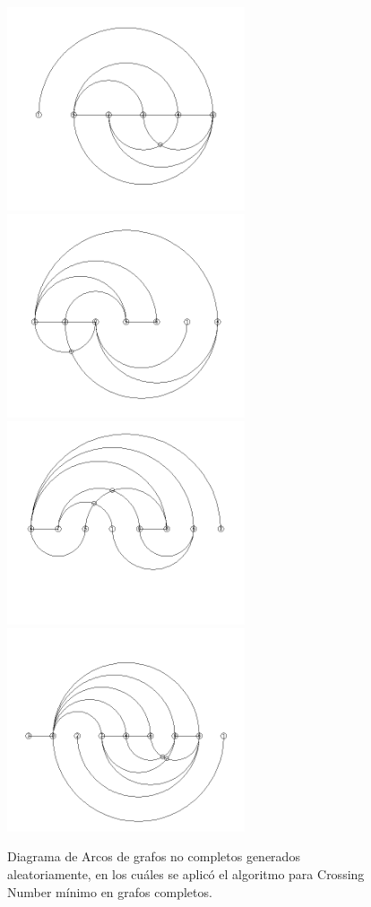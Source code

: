 	\begin{figure}
		\centering
		\includegraphics[width=7cm]{imagenes/grafo_aleatorio_6_nodos_bn.png}
		\includegraphics[width=7cm]{imagenes/grafo_aleatorio_7_nodos_bn.png}\\
		\includegraphics[width=7cm]{imagenes/grafo_aleatorio_8_nodos_bn.png}
		\includegraphics[width=7cm]{imagenes/grafo_aleatorio_9_nodos_bn.png}
		\caption{Diagrama de Arcos de grafos no completos generados aleatoriamente, en los cuáles se aplicó el algoritmo para Crossing Number mínimo en grafos completos.}
		\label{fig:arcdiagram_no_completo}
	\end{figure}
	
